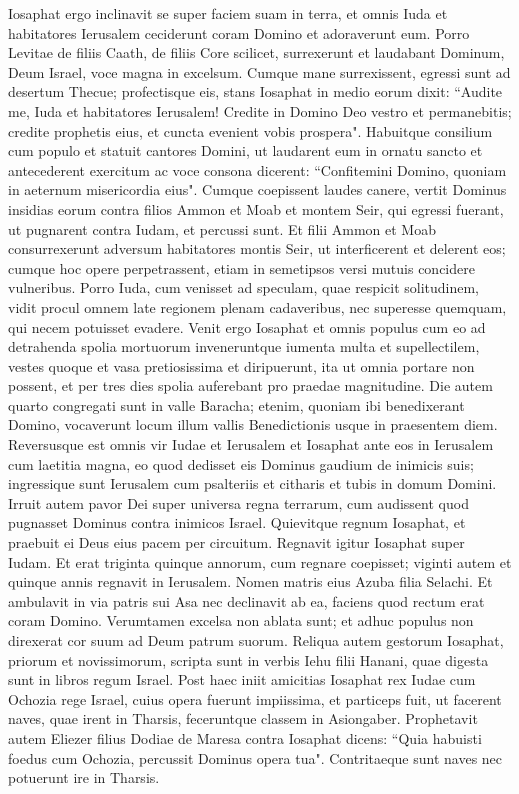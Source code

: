 \begin{biblechapter}
\verse Iosaphat ergo inclinavit se super faciem suam in terra, et omnis Iuda et habitatores Ierusalem ceciderunt coram Domino et adoraverunt eum. 
\verse Porro Levitae de filiis Caath, de filiis Core scilicet, surrexerunt et laudabant Dominum, Deum Israel, voce magna in excelsum. 
\verse Cumque mane surrexissent, egressi sunt ad desertum Thecue; profectisque eis, stans Iosaphat in medio eorum dixit: “Audite me, Iuda et habitatores Ierusalem! Credite in Domino Deo vestro et permanebitis; credite prophetis eius, et cuncta evenient vobis prospera". 
\verse Habuitque consilium cum populo et statuit cantores Domini, ut laudarent eum in ornatu sancto et antecederent exercitum ac voce consona dicerent: “Confitemini Domino, quoniam in aeternum misericordia eius". 
\verse Cumque coepissent laudes canere, vertit Dominus insidias eorum contra filios Ammon et Moab et montem Seir, qui egressi fuerant, ut pugnarent contra Iudam, et percussi sunt. 
\verse Et filii Ammon et Moab consurrexerunt adversum habitatores montis Seir, ut interficerent et delerent eos; cumque hoc opere perpetrassent, etiam in semetipsos versi mutuis concidere vulneribus. 
\verse Porro Iuda, cum venisset ad speculam, quae respicit solitudinem, vidit procul omnem late regionem plenam cadaveribus, nec superesse quemquam, qui necem potuisset evadere. 
\verse Venit ergo Iosaphat et omnis populus cum eo ad detrahenda spolia mortuorum inveneruntque iumenta multa et supellectilem, vestes quoque et vasa pretiosissima et diripuerunt, ita ut omnia portare non possent, et per tres dies spolia auferebant pro praedae magnitudine. 
\verse Die autem quarto congregati sunt in valle Baracha; etenim, quoniam ibi benedixerant Domino, vocaverunt locum illum vallis Benedictionis usque in praesentem diem.  
\verse Reversusque est omnis vir Iudae et Ierusalem et Iosaphat ante eos in Ierusalem cum laetitia magna, eo quod dedisset eis Dominus gaudium de inimicis suis; 
\verse ingressique sunt Ierusalem cum psalteriis et citharis et tubis in domum Domini. 
\verse Irruit autem pavor Dei super universa regna terrarum, cum audissent quod pugnasset Dominus contra inimicos Israel. 
\verse Quievitque regnum Iosaphat, et praebuit ei Deus eius pacem per circuitum. 
\verse Regnavit igitur Iosaphat super Iudam. Et erat triginta quinque annorum, cum regnare coepisset; viginti autem et quinque annis regnavit in Ierusalem. Nomen matris eius Azuba filia Selachi. 
\verse Et ambulavit in via patris sui Asa nec declinavit ab ea, faciens quod rectum erat coram Domino. 
\verse Verumtamen excelsa non ablata sunt; et adhuc populus non direxerat cor suum ad Deum patrum suorum. 
\verse Reliqua autem gestorum Iosaphat, priorum et novissimorum, scripta sunt in verbis Iehu filii Hanani, quae digesta sunt in libros regum Israel. 
\verse Post haec iniit amicitias Iosaphat rex Iudae cum Ochozia rege Israel, cuius opera fuerunt impiissima, 
\verse et particeps fuit, ut facerent naves, quae irent in Tharsis, feceruntque classem in Asiongaber. 
\verse Prophetavit autem Eliezer filius Dodiae de Maresa contra Iosaphat dicens: “Quia habuisti foedus cum Ochozia, percussit Dominus opera tua". Contritaeque sunt naves nec potuerunt ire in Tharsis. 
\end{biblechapter}

